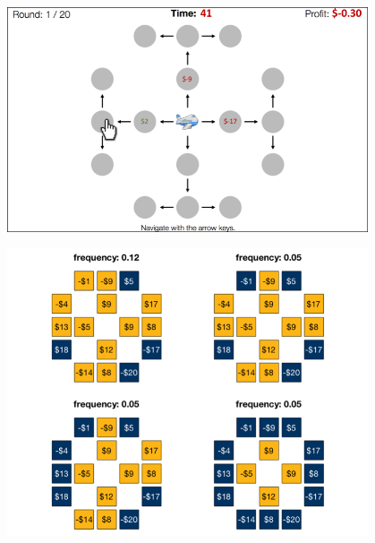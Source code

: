\documentclass[final]{beamer}
\newlength{\onecolwid}
\newlength{\twocolwid}
\begin{document}
\begin{frame}[t, fragile]
\begin{columns}[t]
\begin{column}{\twocolwid}
\begin{columns}[t,totalwidth=\twocolwid]
\begin{column}{\onecolwid}
      \begin{figure}
        \includegraphics[width=0.9\linewidth]{figs/paradigm_illustration1.png}
      \end{figure}
      
      \begin{figure}
        \includegraphics[width=0.9\linewidth]{figs/click_sets_trial4_noFB_small.png}
      
      \end{figure}
    \end{column} %

    \begin{column}{\onecolwid} %
     

\end{column}
\end{columns}
\end{column}
\end{columns}
\end{frame}
\end{document}

